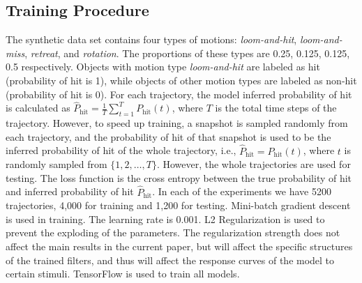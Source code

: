 \subsection{Training Procedure}
The synthetic data set contains four types of motions: \emph{loom-and-hit}, \emph{loom-and-miss}, \emph{retreat}, and \emph{rotation}. The proportions of these types are 0.25, 0.125, 0.125, 0.5 respectively. Objects with motion type \emph{loom-and-hit} are labeled as hit (probability of hit is 1), while objects of other motion types are labeled as non-hit (probability of hit is 0). For each trajectory, the model inferred probability of hit is calculated as $\hat{P}_{\text{hit}}=\frac{1}{T}\sum_{t=1}^{T}P_{\text{hit}}(t)$, where $T$ is the total time steps of the trajectory. However, to speed up training, a snapshot is sampled randomly from each trajectory, and the probability of hit of that snapshot is used to be the inferred probability of hit of the whole trajectory, i.e., $\hat{P}_{\text{hit}}=P_{\text{hit}}(t)$, where $t$ is randomly sampled from $\{1,2,\dots,T\}$. However, the whole trajectories are used for testing. The loss function is the cross entropy between the true probability of hit and inferred probability of hit $\hat{P}_{\text{hit}}$. In each of the experiments we have 5200 trajectories, 4,000 for training and 1,200 for testing. Mini-batch gradient descent is used in training. The learning rate is 0.001. L2 Regularization is used to prevent the exploding of the parameters. The regularization strength does not affect the main results in the current paper, but will affect the specific structures of the trained filters, and thus will affect the response curves of the model to certain stimuli. TensorFlow \citep{abadi2016tensorflow} is used to train all models.

